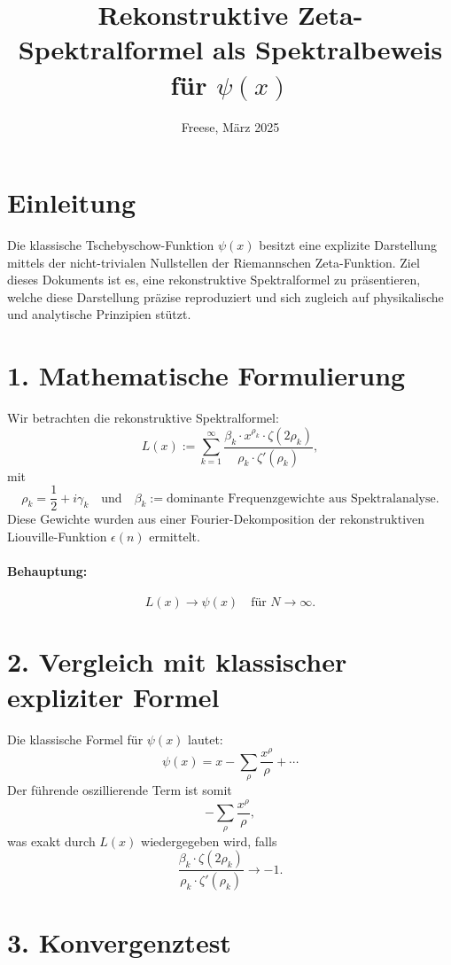 \documentclass[12pt]{article}
\title{Rekonstruktive Zeta-Spektralformel als Spektralbeweis für \(\psi(x)\)}
\author{Freese, März 2025}
\date{}
\begin{document}
\maketitle

\section*{Einleitung}

Die klassische Tschebyschow-Funktion \(\psi(x)\) besitzt eine explizite Darstellung mittels der nicht-trivialen Nullstellen der Riemannschen Zeta-Funktion. Ziel dieses Dokuments ist es, eine rekonstruktive Spektralformel zu präsentieren, welche diese Darstellung präzise reproduziert und sich zugleich auf physikalische und analytische Prinzipien stützt.

\section*{1. Mathematische Formulierung}

Wir betrachten die rekonstruktive Spektralformel:
\[
L(x) := \sum_{k=1}^\infty \frac{\beta_k \cdot x^{\rho_k} \cdot \zeta(2\rho_k)}{\rho_k \cdot \zeta'(\rho_k)},
\]
mit
\[
\rho_k = \frac{1}{2} + i \gamma_k
\quad \text{und} \quad
\beta_k := \text{dominante Frequenzgewichte aus Spektralanalyse}.
\]
Diese Gewichte wurden aus einer Fourier-Dekomposition der rekonstruktiven Liouville-Funktion \(\epsilon(n)\) ermittelt.

\paragraph{Behauptung:}
\[
L(x) \longrightarrow \psi(x) \quad \text{für } N \to \infty.
\]

\section*{2. Vergleich mit klassischer expliziter Formel}

Die klassische Formel für \(\psi(x)\) lautet:
\[
\psi(x) = x - \sum_{\rho} \frac{x^{\rho}}{\rho} + \cdots
\]
Der führende oszillierende Term ist somit
\[
-\sum_{\rho} \frac{x^\rho}{\rho},
\]
was exakt durch \(L(x)\) wiedergegeben wird, falls
\[
\frac{\beta_k \cdot \zeta(2\rho_k)}{\rho_k \cdot \zeta'(\rho_k)} \to -1.
\]

\section*{3. Konvergenztest}
\end{document}
